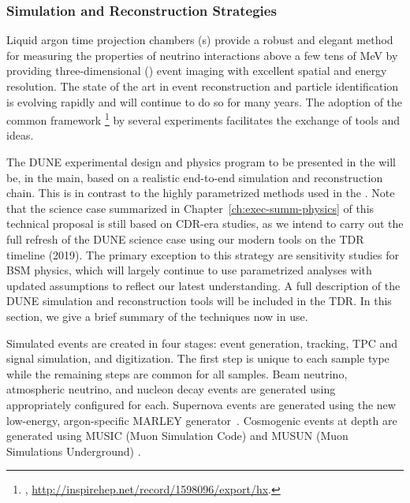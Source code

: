 \subsubsection{Simulation and Reconstruction Strategies}
\label{sec:exec-summ-strat-simreco}

Liquid argon time projection chambers (\lartpc{}s) provide a robust and elegant method for measuring the properties of neutrino interactions above a few tens of MeV by providing three-dimensional (\threed) event imaging with excellent spatial and energy resolution.  The state of the art in \lartpc event reconstruction and particle identification is evolving rapidly and will continue to do so for many years.  The adoption of the common framework \larsoft{}\footnote{\larsoft, \url{http://inspirehep.net/record/1598096/export/hx}.} by several \lartpc experiments facilitates the exchange of tools and ideas.

The DUNE experimental design and physics program to be presented in the  will be, in the main, based on a realistic end-to-end simulation and reconstruction chain.  This is in contrast to the highly parametrized methods used in the .  Note that the science case summarized in Chapter~\ref{ch:exec-summ-physics} of this technical proposal is still based on CDR-era studies, as we intend to carry out the full refresh of the DUNE science case using our modern tools on the TDR timeline (2019).  The primary exception to this strategy are sensitivity studies for BSM physics, which will largely continue to use parametrized analyses with updated assumptions to reflect our latest understanding.  A full description of the DUNE simulation and reconstruction tools will be included in the TDR.  In this section, we give a brief summary of the techniques now in use.

Simulated events are created in four stages: event generation,  tracking, TPC and  signal simulation, and digitization.  The first step is unique to each sample type while the remaining steps are common for all samples. Beam neutrino, atmospheric neutrino, and nucleon decay events are generated using  appropriately configured for each.  Supernova events are generated using the new low-energy, argon-specific MARLEY generator~\cite{marley}.  Cosmogenic events at depth are generated using MUSIC (Muon Simulation Code) \cite{MUSICPaper} and MUSUN (Muon Simulations Underground) \cite{Kudryavtsev:musun}.

